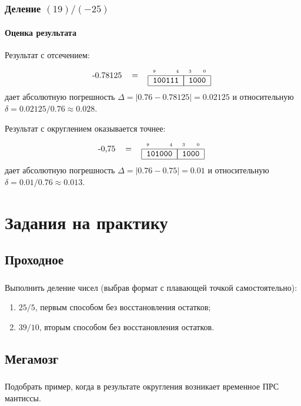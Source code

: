 \begin{frame}
    \frametitle{Деление $(19)/(-25)$}
    \framesubtitle{Оценка результата}
        
    Результат с отсечением:
    \[
        \begin{tabular}{rcc}
           -0.78125 & = & \FloatMyDcCharX{100111}{1000}
        \end{tabular}
    \]
    дает абсолютную погрешность $\Delta=|0.76-0.78125|=0.02125$ и относительную $\delta=0.02125/0.76\approx 0.028$.
    
    Результат с округлением оказывается точнее:
    \[
        \begin{tabular}{rcc}
           -0,75 & = & \FloatMyDcCharX{101000}{1000}
        \end{tabular}
    \]
    дает абсолютную погрешность $\Delta=|0.76-0.75|=0.01$ и относительную $\delta=0.01/0.76\approx 0.013$.
\end{frame}

\appendix


\section{Задания на практику}


\subsection{Проходное}

\begin{frame}
    \frametitle{\TaskSimpleNumber}
    
    Выполнить деление чисел (выбрав формат с плавающей точкой самостоятельно):
    \begin{enumerate}
        \item $25/5$, первым способом без восстановления остатков;

        \item $39/10$, вторым способом без восстановления остатков.
    \end{enumerate}
\end{frame}


\subsection{Мегамозг}

\begin{frame}
    \frametitle{\TaskSimpleNumber}
    
    Подобрать пример, когда в результате округления возникает временное ПРС мантиссы.
\end{frame}

